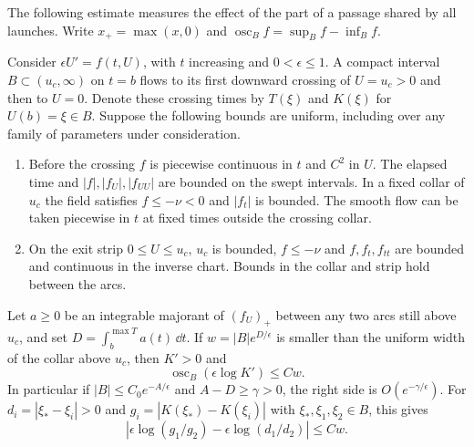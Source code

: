 The following estimate measures the effect of the part of a passage shared
by all launches. Write $x_+=\max(x,0)$ and $\operatorname{osc}_B f
=\sup_B f-\inf_B f$.

\begin{lemma}\label{lem:terminal-distortion}
Consider $\epsilon U'=f(t,U)$, with $t$ increasing and $0<\epsilon\le1$.
A compact interval $B\subset(u_c,\infty)$ on $t=b$ flows to its first
downward crossing of $U=u_c>0$
and then to $U=0$. Denote these crossing times by $T(\xi)$ and $K(\xi)$
for $U(b)=\xi\in B$. Suppose the following bounds are uniform, including
over any family of parameters under consideration.
\begin{enumerate}
\item Before the crossing $f$ is piecewise continuous in $t$ and $C^2$
in $U$. The elapsed time and $|f|,|f_U|,|f_{UU}|$ are bounded on
the swept intervals.
In a fixed collar of $u_c$ the field satisfies $f\le-\nu<0$ and
$|f_t|$ is bounded. The smooth flow can be taken piecewise in $t$
at fixed times outside the crossing collar.
\item On the exit strip $0\le U\le u_c$, $u_c$ is bounded,
$f\le-\nu$ and $f,f_t,f_{tt}$ are bounded and continuous in the
inverse chart. Bounds in the collar and strip hold between the arcs.
\end{enumerate}
Let $a\ge0$ be an integrable majorant of $(f_U)_+$ between any two
arcs still above $u_c$, and set $D=\int_b^{\max T}a(t)\,\dd t$.
If $w=|B|e^{D/\epsilon}$ is smaller than the uniform width of the
collar above $u_c$, then $K'>0$ and
\begin{equation}\label{eq:terminal-distortion}
 \operatorname{osc}_{B}(\epsilon\log K')\le Cw .
\end{equation}
In particular if $|B|\le C_0e^{-A/\epsilon}$ and $A-D\ge\gamma>0$,
the right side is $O(e^{-\gamma/\epsilon})$.
For $d_i=|\xi_*-\xi_i|>0$ and $g_i=|K(\xi_*)-K(\xi_i)|$ with
$\xi_*,\xi_1,\xi_2\in B$, this gives
\[
 \left|\epsilon\log(g_1/g_2)-\epsilon\log(d_1/d_2)\right|\le Cw .
\]
\end{lemma}

